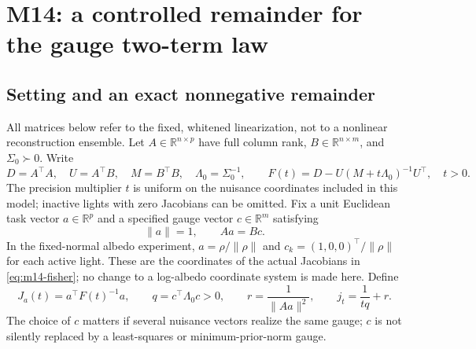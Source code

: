 \section{M14: a controlled remainder for the gauge two-term law}
\label{sec:two-term-remainder}

\subsection{Setting and an exact nonnegative remainder}
\label{subsec:m14-identity}

All matrices below refer to the fixed, whitened linearization, not to a
nonlinear reconstruction ensemble.  Let
$A\in\mathbb{R}^{n\times p}$ have full column rank,
$B\in\mathbb{R}^{n\times m}$, and $\Sigma_0\succ0$.  Write
\begin{equation}
 D=A^\top A,\quad U=A^\top B,\quad M=B^\top B,\quad
 \Lambda_0=\Sigma_0^{-1},\qquad
 F(t)=D-U(M+t\Lambda_0)^{-1}U^\top,\quad t>0.
 \label{eq:m14-fisher}
\end{equation}
The precision multiplier $t$ is uniform on the nuisance coordinates included
in this model; inactive lights with zero Jacobians can be omitted.  Fix a
unit Euclidean task vector $a\in\mathbb{R}^p$ and a specified gauge vector
$c\in\mathbb{R}^m$ satisfying
\begin{equation}
 \|a\|=1,\qquad Aa=Bc.
 \label{eq:m14-gauge}
\end{equation}
In the fixed-normal albedo experiment, $a=\rho/\|\rho\|$ and
$c_k=(1,0,0)^\top/\|\rho\|$ for each active light.  These are the coordinates
of the actual Jacobians in \eqref{eq:m14-fisher}; no change to a log-albedo
coordinate system is made here.  Define
\begin{equation}
 J_a(t)=a^\top F(t)^{-1}a,\qquad
 q=c^\top\Lambda_0c>0,\qquad r=\frac{1}{\|Aa\|^2},\qquad
 j_t=\frac{1}{tq}+r.
 \label{eq:m14-main}
\end{equation}
The choice of $c$ matters if several nuisance vectors realize the same gauge;
$c$ is not silently replaced by a least-squares or minimum-prior-norm gauge.

